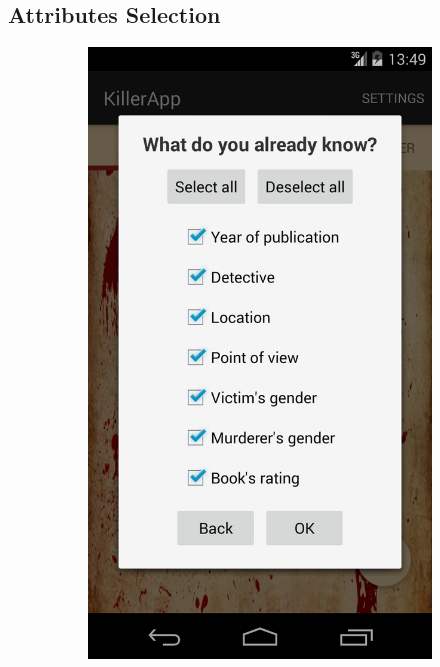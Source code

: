 \documentclass{mproj}
\begin{document}
\subsection*{Attributes Selection}\label{attributes}

\begin{figure}[h]
	\centering
	\begin{subfigure}{0.25\textwidth}
		\includegraphics[width=\textwidth]{images/attributes_dialog}		

\end{subfigure}
\end{figure}
\end{document}

